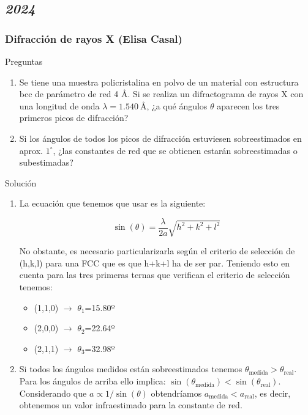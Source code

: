 \subsection*{\textit{2024}}\begin{Enunciado}

	\subsubsection{Difracción de rayos X (Elisa Casal)}
	Preguntas
	\begin{enumerate}[label=\alph*)]
		\item Se tiene una muestra policristalina en polvo de un material con estructura bcc de parámetro de red 4 Å. Si se realiza un difractograma de rayos X con una longitud de onda \( \lambda = 1.540\ \text{\AA} \), ¿a qué ángulos \( \theta \) aparecen los tres primeros picos de difracción?
		\item Si los ángulos de todos los picos de difracción estuviesen sobreestimados en aprox. \( 1^\circ \), ¿las constantes de red que se obtienen estarán sobreestimadas o subestimadas?
	\end{enumerate}
\end{Enunciado}


Solución
\begin{enumerate}[label=\alph*)]
	\item La ecuación que tenemos que usar es la siguiente:

	      \begin{equation}
		      \sin (\theta)=\frac{\lambda}{2a}\sqrt{h^2+k^2+l^2}
	      \end{equation}

	      No obstante, es necesario particularizarla según el criterio de selección de (h,k,l) para una FCC que es que h+k+l ha de ser par. Teniendo esto en cuenta para las tres primeras ternas que verifican el criterio de selección tenemos:

	      \begin{itemize}
		      \item (1,1,0) $\longrightarrow$ $\theta_1$=15.80º
		      \item (2,0,0) $\longrightarrow$ $\theta_2$=22.64º
		      \item (2,1,1) $\longrightarrow$ $\theta_3$=32.98º
	      \end{itemize}

	\item Si todos los ángulos medidos están sobreestimados tenemos $\theta_{\text{medida}}>\theta_{\text{real}}$. Para los ángulos de arriba ello implica: $\sin(\theta_{\text{medida}})<\sin(\theta_{\text{real}})$. Considerando que $a \propto 1/\sin(\theta)$ obtendríamos $a_{\text{medida}}<a_{\text{real}}$, es decir, obtenemos un valor infraestimado para la constante de red.
\end{enumerate}

